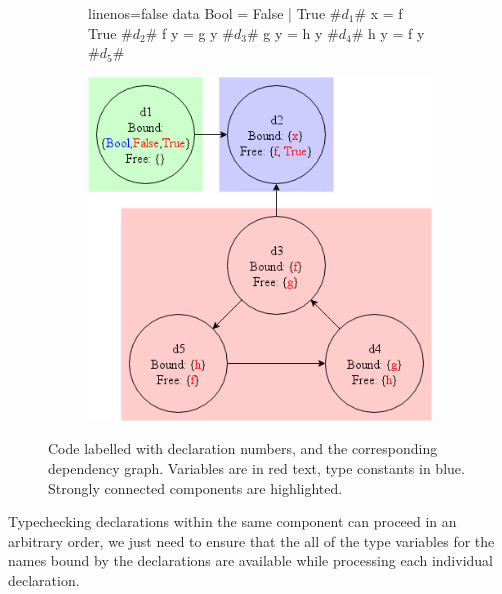 \documentclass[dissertation.tex]{subfiles}
\begin{document}
{{        \begin{figure}[h]
        \centering
        \begin{subfigure}[b]{0.45\textwidth}
            \begin{haskellfigure*}{linenos=false}
            data Bool = False | True      #\(d_1\)#
            x = f True                    #\(d_2\)#
            f y = g y                     #\(d_3\)#
            g y = h y                     #\(d_4\)#
            h y = f y                     #\(d_5\)#
            \end{haskellfigure*}
        \end{subfigure}
        \begin{subfigure}[b]{0.5\textwidth}
            \includegraphics[width=\textwidth]{figures/dependency_graph.png}
        \end{subfigure}
        \caption
        {
            Code labelled with declaration numbers, and the corresponding dependency graph. Variables are
            in red text, type constants in blue. Strongly connected components are highlighted.
        }
        \label{fig:dependency-graph}
        \end{figure}

        Typechecking declarations within the same component can proceed in an arbitrary order, we just need to ensure
        that the all of the type variables for the names bound by the declarations are available while processing each
        individual declaration.

}}
\end{document}

